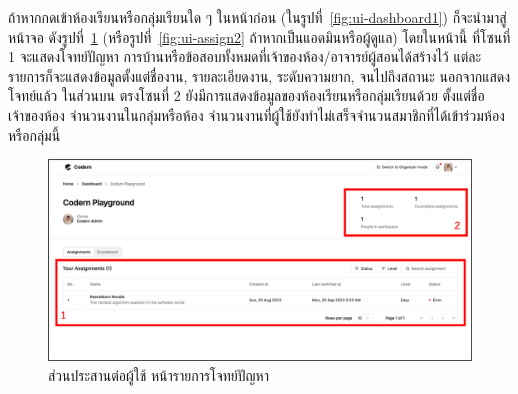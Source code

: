 \documentclass[12pt,one side,openright,a4paper]{cpe-thesis-th}
\newcommand{\thaijustify}[1]{%
  \par\hspace{30pt}\justifying
  #1
}
\begin{document}
    \thaijustify{
        ถ้าหากกดเข้าห้องเรียนหรือกลุ่มเรียนใด ๆ ในหน้าก่อน (ในรูปที่~\ref{fig:ui-dashboard1}) ก็จะนำมาสู่หน้าจอ ดังรูปที่~\ref{fig:ui-assign1} (หรือรูปที่~\ref{fig:ui-assign2} ถ้าหากเป็นแอดมินหรือผู้ดูแล) โดยในหน้านี้ ที่โซนที่ 1 จะแสดงโจทย์ปัญหา การบ้านหรือข้อสอบทั้งหมดที่เจ้าของห้อง/อาจารย์ผู้สอนได้สร้างไว้ แต่ละรายการก็จะแสดงข้อมูลตั้งแต่ชื่องาน, รายละเอียดงาน, ระดับความยาก, จนไปถึงสถานะ นอกจากแสดงโจทย์แล้ว ในส่วนบน ตรงโซนที่ 2 ยังมีการแสดงข้อมูลของห้องเรียนหรือกลุ่มเรียนด้วย ตั้งแต่ชื่อเจ้าของห้อง จำนวนงานในกลุ่มหรือห้อง จำนวนงานที่ผู้ใช้ยังทำไม่เสร็จจำนวนสมาชิกที่ได้เข้าร่วมห้องหรือกลุ่มนี้
    }
    \hypertarget{ui-assign1}{
        \begin{figure}[H]
        \centering
            \includegraphics[width=15cm]{figure/ui/ui-assign1.png}
            \caption[ส่วนประสานต่อผู้ใช้ หน้ารายการโจทย์ปัญหา]{ส่วนประสานต่อผู้ใช้ หน้ารายการโจทย์ปัญหา}
            \label{fig:ui-assign1}
        \end{figure}
    }
    
\end{document}
